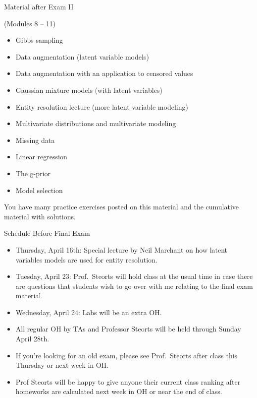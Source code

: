 \documentclass[ignorenonframetext,]{beamer}
\providecommand{\tightlist}{%
  \setlength{\itemsep}{0pt}\setlength{\parskip}{0pt}}
\begin{document}
\begin{frame}{Material after Exam II}

(Modules 8 -- 11)

\begin{itemize}
\tightlist
\item
  Gibbs sampling
\item
  Data augmentation (latent variable models)
\item
  Data augmentation with an application to censored values
\item
  Gaussian mixture models (with latent variables)
\item
  Entity resolution lecture (more latent variable modeling)
\item
  Multivariate distributions and multivariate modeling
\item
  Missing data
\item
  Linear regression
\item
  The g-prior
\item
  Model selection
\end{itemize}

You have many practice exercises posted on this material and the
cumulative material with solutions.

\end{frame}

\begin{frame}{Schedule Before Final Exam}

\begin{itemize}
\tightlist
\item
  Thursday, April 16th: Special lecture by Neil Marchant on how latent
  variables models are used for entity resolution.
\item
  Tuesday, April 23: Prof.~Steorts will hold class at the usual time in
  case there are questions that students wish to go over with me
  relating to the final exam material.
\item
  Wednesday, April 24: Labs will be an extra OH.
\item
  All regular OH by TAs and Professor Steorts will be held through
  Sunday April 28th.
\item
  If you're looking for an old exam, please see Prof.~Steorts after
  class this Thursday or next week in OH.
\item
  Prof Steorts will be happy to give anyone their current class ranking
  after homeworks are calculated next week in OH or near the end of
  class.
\end{itemize}

\end{frame}
\end{document}

